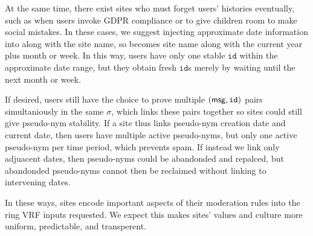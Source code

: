 At the same time, there exist sites who must forget users' histories
eventually, such as when users invoke GDPR compliance or to give children
room to make social mistakes.  In these cases, we suggest injecting
approximate date information into \msg along with the site name,
so \msg becomes site name along with the current year plus month or week.
In this way, users have only one stable $\mathtt{id}$ within the
approximate date range, but they obtain fresh $\mathtt{id}$s merely
by waiting until the next month or week.

If desired, users still have the choice to prove multiple $(\mathsf{msg},\mathtt{id})$
pairs simultaniously in the same $\sigma$, which links these pairs
together so sites could still give pseudo-nym stability.
If a site thus links pseudo-nym creation date and current date, then
users have multiple active pseudo-nyms, but only one active pseudo-nym
per time period, which prevents spam.  If instead we link only adjuacent
dates, then pseudo-nyms could be abandonded and repalced, but abandonded
pseudo-nyms cannot then be reclaimed without linking to intervening dates.

In these ways, sites encode important aspects of their moderation rules
into the ring VRF inputs requested.  We expect this makes sites' values
and culture more uniform, predictable, and transperent.




